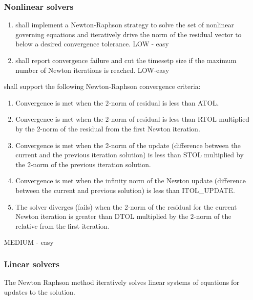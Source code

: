 \subsubsection{Nonlinear solvers}
\begin{enumerate}[resume]
	\item \pft shall implement a Newton-Raphson strategy to solve the set of nonlinear governing equations and iteratively drive the norm of the residual vector to below a desired convergence tolerance. \label{nonlinearSolver} LOW - easy
	\item \pft shall report convergence failure and cut the timesetp size if the maximum number of Newton iterations is reached. \label{nonlinearReport} LOW-easy
\end{enumerate}
\vspace{0.25cm}
\pft shall support the following Newton-Raphson convergence criteria:
\begin{enumerate}[resume]
	\item \label{nonlinearATOL} Convergence is met when the 2-norm of residual is less than ATOL.
	\item \label{nonlinearRTOL} Convergence is met when the 2-norm of residual is less than RTOL multiplied by the 2-norm of the residual from the first Newton iteration.
	\item \label{nonlinearSTOL} Convergence is met when the 2-norm of the update (difference between the current and the previous iteration solution) is less than STOL multiplied by the 2-norm of the previous iteration solution.
	\item \label{nonlinearITOL} Convergence is met when the infinity norm of the Newton update (difference between the current and previous solution) is less than ITOL\_UPDATE.
	\item \label{nonlinearDTOL} The solver diverges (fails) when the 2-norm of the residual for the current Newton iteration is greater than DTOL multiplied by the 2-norm of the relative from the first iteration.
\end{enumerate}
MEDIUM - easy

\subsubsection{Linear solvers}
The Newton Raphson method iteratively solves linear systems of equations for updates to the solution.

